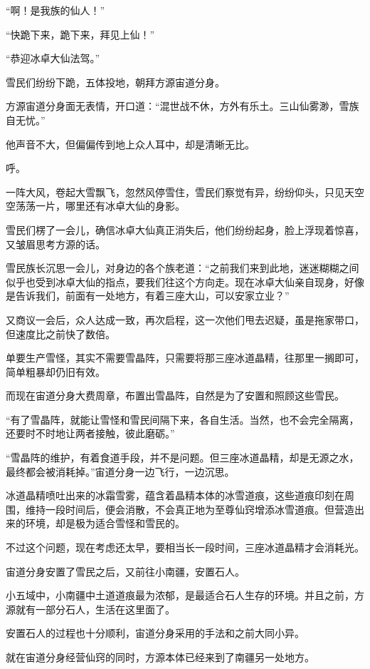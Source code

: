 \begin{this_body}
“啊！是我族的仙人！”

“快跪下来，跪下来，拜见上仙！”

“恭迎冰卓大仙法驾。”

雪民们纷纷下跪，五体投地，朝拜方源宙道分身。

方源宙道分身面无表情，开口道：“混世战不休，方外有乐土。三山仙雾渺，雪族自无忧。”

他声音不大，但偏偏传到地上众人耳中，却是清晰无比。

呼。

一阵大风，卷起大雪飘飞，忽然风停雪住，雪民们察觉有异，纷纷仰头，只见天空空荡荡一片，哪里还有冰卓大仙的身影。

雪民们楞了一会儿，确信冰卓大仙真正消失后，他们纷纷起身，脸上浮现着惊喜，又皱眉思考方源的话。

雪民族长沉思一会儿，对身边的各个族老道：“之前我们来到此地，迷迷糊糊之间似乎也受到冰卓大仙的指点，要我们往这个方向走。现在冰卓大仙亲自现身，好像是告诉我们，前面有一处地方，有着三座大山，可以安家立业？”

又商议一会后，众人达成一致，再次启程，这一次他们甩去迟疑，虽是拖家带口，但速度比之前快了数倍。

单要生产雪怪，其实不需要雪晶阵，只需要将那三座冰道晶精，往那里一搁即可，简单粗暴却仍旧有效。

而现在宙道分身大费周章，布置出雪晶阵，自然是为了安置和照顾这些雪民。

“有了雪晶阵，就能让雪怪和雪民间隔下来，各自生活。当然，也不会完全隔离，还要时不时地让两者接触，彼此磨砺。”

“雪晶阵的维护，有着食道手段，并不是问题。但三座冰道晶精，却是无源之水，最终都会被消耗掉。”宙道分身一边飞行，一边沉思。

冰道晶精喷吐出来的冰霜雪雾，蕴含着晶精本体的冰雪道痕，这些道痕印刻在周围，维持一段时间后，便会消散，不会真正地为至尊仙窍增添冰雪道痕。但营造出来的环境，却是极为适合雪怪和雪民的。

不过这个问题，现在考虑还太早，要相当长一段时间，三座冰道晶精才会消耗光。

宙道分身安置了雪民之后，又前往小南疆，安置石人。

小五域中，小南疆中土道道痕最为浓郁，是最适合石人生存的环境。并且之前，方源就有一部分石人，生活在这里面了。

安置石人的过程也十分顺利，宙道分身采用的手法和之前大同小异。

就在宙道分身经营仙窍的同时，方源本体已经来到了南疆另一处地方。


\end{this_body}
